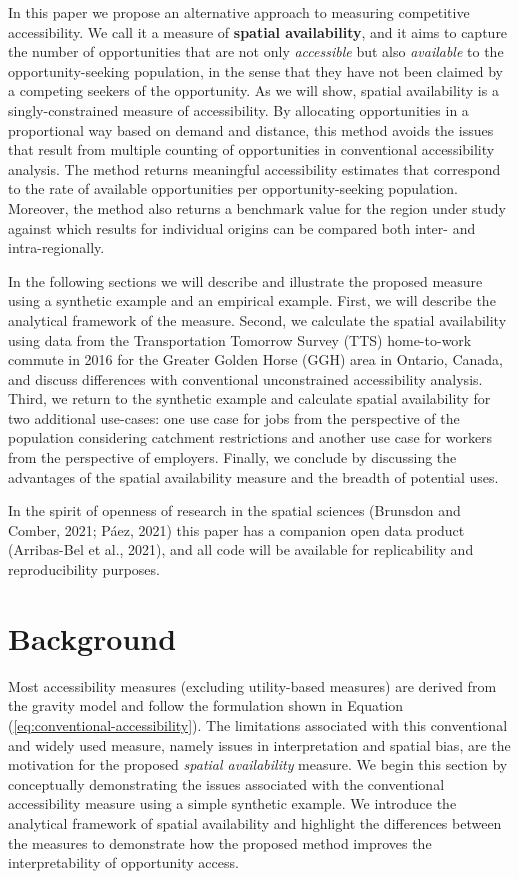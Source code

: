 \documentclass[]{elsarticle} %
\begin{document}
In this paper we propose an alternative approach to measuring
competitive accessibility. We call it a measure of \textbf{spatial
availability}, and it aims to capture the number of opportunities that
are not only \emph{accessible} but also \emph{available} to the
opportunity-seeking population, in the sense that they have not been
claimed by a competing seekers of the opportunity. As we will show,
spatial availability is a singly-constrained measure of accessibility.
By allocating opportunities in a proportional way based on demand and
distance, this method avoids the issues that result from multiple
counting of opportunities in conventional accessibility analysis. The
method returns meaningful accessibility estimates that correspond to the
rate of available opportunities per opportunity-seeking population.
Moreover, the method also returns a benchmark value for the region under
study against which results for individual origins can be compared both
inter- and intra-regionally.

In the following sections we will describe and illustrate the proposed
measure using a synthetic example and an empirical example. First, we
will describe the analytical framework of the measure. Second, we
calculate the spatial availability using data from the Transportation
Tomorrow Survey (TTS) home-to-work commute in 2016 for the Greater
Golden Horse (GGH) area in Ontario, Canada, and discuss differences with
conventional unconstrained accessibility analysis. Third, we return to
the synthetic example and calculate spatial availability for two
additional use-cases: one use case for jobs from the perspective of the
population considering catchment restrictions and another use case for
workers from the perspective of employers. Finally, we conclude by
discussing the advantages of the spatial availability measure and the
breadth of potential uses.

In the spirit of openness of research in the spatial sciences (Brunsdon
and Comber, 2021; Páez, 2021) this paper has a companion open data
product (Arribas-Bel et al., 2021), and all code will be available for
replicability and reproducibility purposes.

\hypertarget{background}{%
\section{Background}\label{background}}

Most accessibility measures (excluding utility-based measures) are
derived from the gravity model and follow the formulation shown in
Equation (\ref{eq:conventional-accessibility}). The limitations
associated with this conventional and widely used measure, namely issues
in interpretation and spatial bias, are the motivation for the proposed
\emph{spatial availability} measure. We begin this section by
conceptually demonstrating the issues associated with the conventional
accessibility measure using a simple synthetic example. We introduce the
analytical framework of spatial availability and highlight the
differences between the measures to demonstrate how the proposed method
improves the interpretability of opportunity access.
\end{document}

